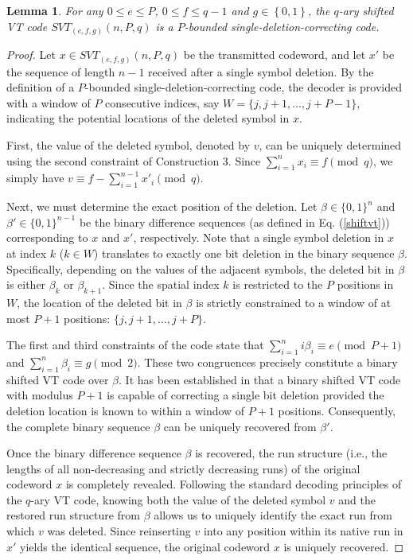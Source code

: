 \documentclass[pdflatex,sn-mathphys-num]{sn-jnl}
\theoremstyle{theorem}%
\newtheorem{lemma}{Lemma}
\theoremstyle{definition}
\theoremstyle{construction}
\newtheorem{open problem}{Open problem}
\begin{document}
\begin{lemma}
For any $0\le e\le P$, $0\le f\le q-1$ and $g\in \left\{0,1\right\}$, the $q$-ary shifted VT code $SVT_{(e,f,g)}(n,P,q)$ is a $P$-bounded single-deletion-correcting code.
\end{lemma}
\begin{proof}
	Let $x \in SVT_{(e,f,g)}(n,P,q)$ be the transmitted codeword, and let $x'$ be the sequence of length $n-1$ received after a single symbol deletion. By the definition of a $P$-bounded single-deletion-correcting code, the decoder is provided with a window of $P$ consecutive indices, say $W = \{j, j+1, \dots, j+P-1\}$, indicating the potential locations of the deleted symbol in $x$.
	
	First, the value of the deleted symbol, denoted by $v$, can be uniquely determined using the second constraint of Construction 3. Since $\sum_{i=1}^n x_i \equiv f \pmod{q}$, we simply have $v \equiv f - \sum_{i=1}^{n-1} x'_i \pmod{q}$.
	
	Next, we must determine the exact position of the deletion. Let $\beta \in \{0,1\}^n$ and $\beta' \in \{0,1\}^{n-1}$ be the binary difference sequences (as defined in Eq. (\ref{shiftvt})) corresponding to $x$ and $x'$, respectively. Note that a single symbol deletion in $x$ at index $k$ ($k \in W$) translates to exactly one bit deletion in the binary sequence $\beta$. Specifically, depending on the values of the adjacent symbols, the deleted bit in $\beta$ is either $\beta_k$ or $\beta_{k+1}$. Since the spatial index $k$ is restricted to the $P$ positions in $W$, the location of the deleted bit in $\beta$ is strictly constrained to a window of at most $P+1$ positions: $\{j, j+1, \dots, j+P\}$.
	
	The first and third constraints of the code state that $\sum_{i=1}^n i\beta_i \equiv e \pmod{P+1}$ and $\sum_{i=1}^n \beta_i \equiv g \pmod{2}$. These two congruences precisely constitute a binary shifted VT code over $\beta$. It has been established in \cite{sw} that a binary shifted VT code with modulus $P+1$ is capable of correcting a single bit deletion provided the deletion location is known to within a window of $P+1$ positions. Consequently, the complete binary sequence $\beta$ can be uniquely recovered from $\beta'$.
	
	Once the binary difference sequence $\beta$ is recovered, the run structure (i.e., the lengths of all non-decreasing and strictly decreasing runs) of the original codeword $x$ is completely revealed. Following the standard decoding principles of the $q$-ary VT code, knowing both the value of the deleted symbol $v$ and the restored run structure from $\beta$ allows us to uniquely identify the exact run from which $v$ was deleted. Since reinserting $v$ into any position within its native run in $x'$ yields the identical sequence, the original codeword $x$ is uniquely recovered.
\end{proof}
\end{document}
